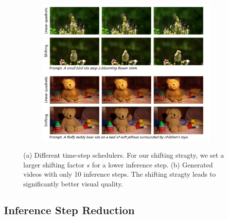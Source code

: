 \begin{figure}[htbp]
\begin{subfigure}[b]{0.28\textwidth}
        \caption{}
        \label{fig:shifting}
    \end{subfigure}
    \hfill
    \begin{subfigure}[b]{0.69\textwidth} %
        \centering
        \includegraphics[width=\textwidth]{figures/shifting_example.pdf}
        \caption{}
        \label{fig:shifting_example}
    \end{subfigure}
    \caption{(a) Different time-step schedulers. For our shifting stragty, we set a larger shifting factor $s$ for a lower inference step. (b) Generated videos with only 10 inference steps. The shifting stragty leads to significantly better visual quality.}
    \label{fig:overall}
\end{figure}


\subsection{Inference Step Reduction }

